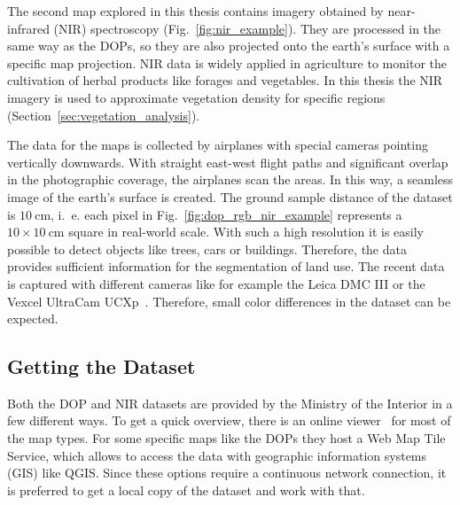 The second map explored in this thesis contains imagery obtained by near-infrared (NIR) spectroscopy (Fig.~\ref{fig:nir_example}). They are processed in the same way as the DOPs, so they are also projected onto the earth's surface with a specific map projection. NIR data is widely applied in agriculture to monitor the cultivation of herbal products like forages and vegetables. In this thesis the NIR imagery is used to approximate vegetation density for specific regions (Section~\ref{sec:vegetation_analysis}).

The data for the maps is collected by airplanes with special cameras pointing vertically downwards. With straight east-west flight paths and significant overlap in the photographic coverage, the airplanes scan the areas. In this way, a seamless image of the earth's surface is created. The ground sample distance of the dataset is $10~\text{cm}$, i.~e. each pixel in Fig.~\ref{fig:dop_rgb_nir_example} represents a $10\times 10~\text{cm}$ square in real-world scale. With such a high resolution it is easily possible to detect objects like trees, cars or buildings. Therefore, the data provides sufficient information for the segmentation of land use. The recent data is captured with different cameras like for example the Leica DMC III or the Vexcel UltraCam UCXp~\cite{topo-image16}. Therefore, small color differences in the dataset can be expected.

\subsection{Getting the Dataset}
Both the DOP and NIR datasets are provided by the Ministry of the Interior in a few different ways. To get a quick overview, there is an online viewer~\cite{tim_online20} for most of the map types. For some specific maps like the DOPs they host a Web Map Tile Service, which allows to access the data with geographic information systems (GIS) like QGIS. Since these options require a continuous network connection, it is preferred to get a local copy of the dataset and work with that.


